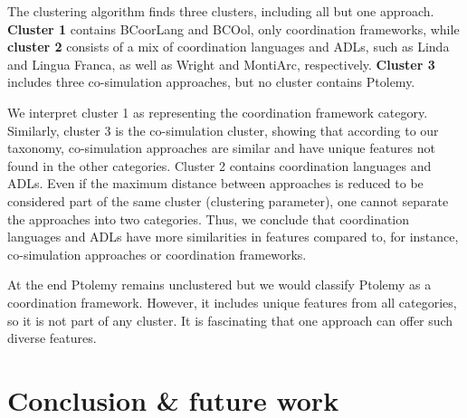 \documentclass[runningheads]{llncs}
\begin{document}
The clustering algorithm finds three clusters, including all but one approach.
\textbf{Cluster 1} contains BCoorLang and BCOol, only coordination frameworks, while \textbf{cluster 2} consists of a mix of coordination languages and ADLs, such as Linda and Lingua Franca, as well as Wright and MontiArc, respectively.
\textbf{Cluster 3} includes three co-simulation approaches, but no cluster contains Ptolemy.

We interpret cluster 1 as representing the coordination framework category.
Similarly, cluster 3 is the co-simulation cluster, showing that according to our taxonomy, co-simulation approaches are similar and have unique features not found in the other categories.
Cluster 2 contains coordination languages and ADLs.
Even if the maximum distance between approaches is reduced to be considered part of the same cluster (clustering parameter), one cannot separate the approaches into two categories.
Thus, we conclude that coordination languages and ADLs have more similarities in features compared to, for instance, co-simulation approaches or coordination frameworks.

At the end Ptolemy remains unclustered but we would classify Ptolemy as a coordination framework.
However, it includes unique features from all categories, so it is not part of any cluster.
It is fascinating that one approach can offer such diverse features.


\section{Conclusion \& future work} \label{sec: conclusion}



\end{document}
